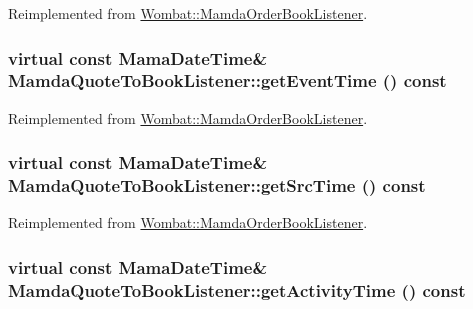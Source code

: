 Reimplemented from \hyperlink{classWombat_1_1MamdaOrderBookListener_be0061292ee9bd7ef1d890bd825b1a0d}{Wombat::Mamda\-Order\-Book\-Listener}.\hypertarget{classMamdaQuoteToBookListener_ff147fdfb64bad58dc439addc0eea46b}{
\subsubsection[getEventTime]{\setlength{\rightskip}{0pt plus 5cm}virtual const Mama\-Date\-Time\& Mamda\-Quote\-To\-Book\-Listener::get\-Event\-Time () const}}
\label{classMamdaQuoteToBookListener_ff147fdfb64bad58dc439addc0eea46b}




Reimplemented from \hyperlink{classWombat_1_1MamdaOrderBookListener_c0272dc0cb65d7b3a55b8216b12acda6}{Wombat::Mamda\-Order\-Book\-Listener}.\hypertarget{classMamdaQuoteToBookListener_1c5157c6e1d241d1d78133731b44d01a}{
\subsubsection[getSrcTime]{\setlength{\rightskip}{0pt plus 5cm}virtual const Mama\-Date\-Time\& Mamda\-Quote\-To\-Book\-Listener::get\-Src\-Time () const}}
\label{classMamdaQuoteToBookListener_1c5157c6e1d241d1d78133731b44d01a}




Reimplemented from \hyperlink{classWombat_1_1MamdaOrderBookListener_44f0107552d26551644736520b00b530}{Wombat::Mamda\-Order\-Book\-Listener}.\hypertarget{classMamdaQuoteToBookListener_d8627c07f82c0c7c88401cc096e16cd8}{
\subsubsection[getActivityTime]{\setlength{\rightskip}{0pt plus 5cm}virtual const Mama\-Date\-Time\& Mamda\-Quote\-To\-Book\-Listener::get\-Activity\-Time () const}}
\label{classMamdaQuoteToBookListener_d8627c07f82c0c7c88401cc096e16cd8}




